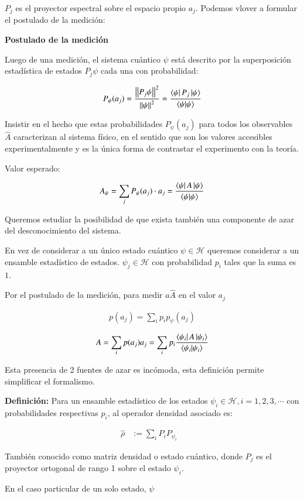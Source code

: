$P_j$ es el proyector espectral sobre el espacio propio $a_j$. Podemos vlover a formular el postulado de la medición:

\bigskip

\textbf{Postulado de la medición}

Luego de una medición, el sistema cuántico $\psi$ está descrito por la superposición estadística de estados $P_j\psi$ cada una con probabilidad:

\begin{align*}
    P_\psi(a_j)=\frac{\abs{\abs{P_j\psi}}^2}{\abs{\abs{\psi}}^2}=\frac{\bra{\psi}P_j\ket{\psi}}{\bra{\psi}\ket{\psi}}
\end{align*}

Insistir en el hecho que estas probabilidades $P_\psi(a_j)$ para todos los observables $\hat{A}$ caracterizan al sistema físico, en el sentido que son los valores accesibles experimentalmente y es la única forma de contrastar el experimento con la teoría.

Valor esperado:

\begin{align*}
    A _\psi = \sum_j P_\psi (a_j)\cdot a_j=\frac{\bra{\psi}A\ket{\psi}}{\bra{\psi}\ket{\psi}}
\end{align*}

Queremos estudiar la posibilidad de que exista también una componente de azar del desconocimiento del sistema.

En vez de considerar a un único estado cuántico $\psi\in\mathcal{H}$ queremos considerar a un ensamble estadístico de estados. $\psi_j\in\mathcal{H}$ con probabilidad $p_i$ tales que la suma es $1$.

Por el postulado de la medición, para medir $a\hat{A}$ en el valor $a_j$

\begin{align*}
    p(a_j)=\sum_i p_ip_\psi(a_j)
\end{align*}

\begin{align*}
    A = \sum_i p(a_j)a_j=\sum_i p_i \frac{\bra{\psi_i}A\ket{\psi_i}}{\bra{\psi_i}\ket{\psi_i}}
\end{align*}

Esta presencia de 2 fuentes de azar es incómoda, esta definición permite simplificar el formalismo.

\bigskip

\textbf{Definición:} Para un ensamble estadístico de los estados $\psi_i\in\mathcal{H}, i=1,2,3,\cdots$ con probabilidades respectivas $p_i$, al operador densidad asociado es:

\begin{align*}
    \hat{\rho}&:=\sum_i P_iP_{\psi_i}&
\end{align*}


También conocido como matriz densidad o estado cuántico, donde $P_j$ es el proyector ortogonal de rango 1 sobre el estado $\psi_i$.

En el caso particular de un solo estado, $\psi$